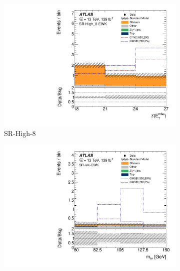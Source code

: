 \begin{figure}[tp]
\centering
\begin{subfigure}{0.48\textwidth}
\centering
\includegraphics[width=\textwidth]{figures/2ljets_sr_high_8_met_sig.pdf}
\caption{SR-High-8}
\end{subfigure}
\hfill
\begin{subfigure}{0.48\textwidth}
\centering
\includegraphics[width=\textwidth]{figures/2ljets_sr_llbb_mbb.pdf}
\caption{\srllbb}
\end{subfigure}
\\[0.5em]
\begin{subfigure}{0.48\textwidth}
\centering

\end{subfigure}
\end{figure}
